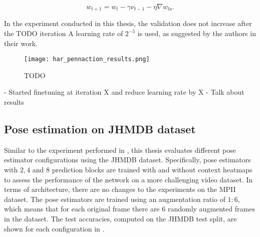 \begin{equation}
    w_{t+1} = w_t - \gamma \nu_{t-1} - \eta \nabla w_{la}.
\end{equation}

In the experiment conducted in this thesis, the validation does not increase after the TODO iteration
A learning rate of $2^{-5}$ is used, as suggested by the authors in their work.

\begin{figure}[htb!]
    \centering
    \texttt{[image: har\_pennaction\_results.png]}
    \caption{TODO}
    \label{fig:har_pennaction_results}
\end{figure}

- Started finetuning at iteration X and reduce learning rate by X %
- Talk about results

\subsection{Pose estimation on JHMDB dataset}
\label{sec:exp-pose-jhmdb}
Similar to the experiment performed in , this thesis evaluates different pose estimator configurations using the JHMDB dataset.
Specifically, pose estimators with $2, 4$ and $8$ prediction blocks are trained with and without context heatmaps to assess the performance of the network on a more challenging video dataset.
In terms of architecture, there are no changes to the experiments on the MPII dataset.
The pose estimators are trained using an augmentation ratio of $1:6$, which means that for each original frame there are $6$ randomly augmented frames in the dataset.
The test accuracies, computed on the JHMDB test split, are shown for each configuration in .



